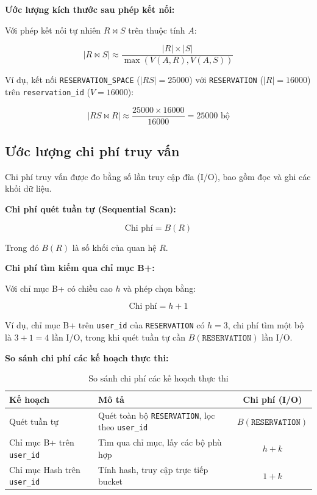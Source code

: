 \textbf{Ước lượng kích thước sau phép kết nối:}

Với phép kết nối tự nhiên $R \bowtie S$ trên thuộc tính $A$:

$$|R \bowtie S| \approx \frac{|R| \times |S|}{\max(V(A,R), V(A,S))}$$

Ví dụ, kết nối \texttt{RESERVATION\_SPACE} ($|RS| = 25000$) với \texttt{RESERVATION} ($|R| = 16000$) trên \texttt{reservation\_id} ($V = 16000$):

$$|RS \bowtie R| \approx \frac{25000 \times 16000}{16000} = 25000 \text{ bộ}$$

\subsection{Ước lượng chi phí truy vấn}

Chi phí truy vấn được đo bằng số lần truy cập đĩa (I/O), bao gồm đọc và ghi các khối dữ liệu.

\textbf{Chi phí quét tuần tự (Sequential Scan):}

$$\text{Chi phí} = B(R)$$

Trong đó $B(R)$ là số khối của quan hệ $R$.

\textbf{Chi phí tìm kiếm qua chỉ mục B+:}

Với chỉ mục B+ có chiều cao $h$ và phép chọn bằng:

$$\text{Chi phí} = h + 1$$

Ví dụ, chỉ mục B+ trên \texttt{user\_id} của \texttt{RESERVATION} có $h = 3$, chi phí tìm một bộ là $3 + 1 = 4$ lần I/O, trong khi quét tuần tự cần $B(\texttt{RESERVATION})$ lần I/O.

\textbf{So sánh chi phí các kế hoạch thực thi:}

\begin{table}[htbp]
\centering
\begin{tabularx}{\linewidth}{|l|X|c|}
\hline
\textbf{Kế hoạch} & \textbf{Mô tả} & \textbf{Chi phí (I/O)} \\
\hline
Quét tuần tự & Quét toàn bộ \texttt{RESERVATION}, lọc theo \texttt{user\_id} & $B(\texttt{RESERVATION})$ \\
\hline
Chỉ mục B+ trên \texttt{user\_id} & Tìm qua chỉ mục, lấy các bộ phù hợp & $h + k$ \\
\hline
Chỉ mục Hash trên \texttt{user\_id} & Tính hash, truy cập trực tiếp bucket & $1 + k$ \\
\hline
\end{tabularx}
\caption{So sánh chi phí các kế hoạch thực thi}
\end{table}

